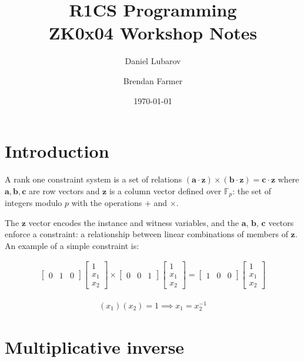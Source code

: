 \documentclass{article}
\title{R1CS Programming \\ \large ZK0x04 Workshop Notes}
\author{Daniel Lubarov \and Brendan Farmer}
\date{\today}
\renewcommand{\vec}[1]{\mathbf{#1}}
\begin{document}
\maketitle

{\hypersetup{hidelinks} \tableofcontents}
\newpage

\section{Introduction}

A rank one constraint system is a set of relations $(\vec{a}\cdot \vec{z})\times(\vec{b} \cdot \vec{z}) = \vec{c}\cdot \vec{z}$ where $\vec{a}, \vec{b}, \vec{c}$ are row vectors and $\vec{z}$ is a column vector defined over $\mathbb{F}_p$: the set of integers modulo $p$ with the operations $+$ and $\times$. 

The $\vec{z}$ vector encodes the instance and witness variables, and the $\vec{a}$, $\vec{b}$, $\vec{c}$ vectors enforce a constraint: a relationship between linear combinations of members of $\vec{z}$. An example of a simple constraint is:

  \begin{align}
      \begin{bmatrix}
	  0 & 1 & 0
	\end{bmatrix}
    \begin{bmatrix}
	  1 \\
	  x_{1} \\
	  x_{2}
	\end{bmatrix}
	\times
	 \begin{bmatrix}
	  0 & 0 & 1
	\end{bmatrix}
    \begin{bmatrix}
	  1 \\
	  x_{1} \\
	  x_{2}
	\end{bmatrix}
	=
	\begin{bmatrix}
	  1 & 0 & 0
	\end{bmatrix}
    \begin{bmatrix}
	  1 \\
	  x_{1} \\
	  x_{2}
	\end{bmatrix}
  \end{align}
  
  \begin{align}
	(x_{1}) (x_{2}) = 1 \implies x_{1} = x_{2}^{-1}
  \end{align}

\section{Multiplicative inverse} \label{sec:inverse}
\end{document}

